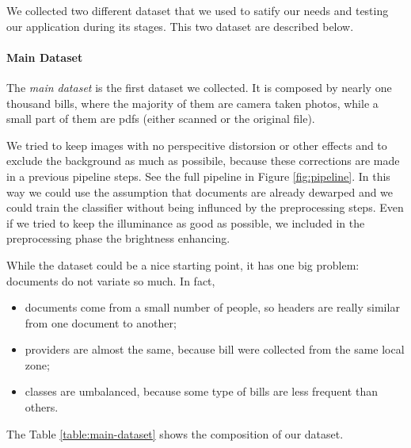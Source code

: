 \documentclass[10pt,twocolumn,letterpaper]{article}
\begin{document}
We collected two different dataset that we used to satify our needs
and testing our application during its stages. This two dataset are
described below.

\paragraph{Main Dataset}
\label{par:main-dataset}

The \emph{main dataset} is the first dataset we collected. It is
composed by nearly one thousand bills, where the majority of them are
camera taken photos, while a small part of them are pdfs (either
scanned or the original file).

We tried to keep images with no perspecitive distorsion or other
effects and to exclude the background as much as possibile, because
these corrections are made in a previous pipeline steps. See the full
pipeline in Figure \ref{fig:pipeline}.  In this way we could use the
assumption that documents are already dewarped and we could train the
classifier without being influnced by the preprocessing steps. Even if
we tried to keep the illuminance as good as possible, we included in
the preprocessing phase the brightness enhancing.

While the dataset could be a nice starting point, it has one big
problem: documents do not variate so much. In fact,
\begin{itemize}
  \item documents come from a small number of people, so headers are
    really similar from one document to another;
  \item providers are almost the same, because bill were collected
    from the same local zone;
  \item classes are umbalanced, because some type of bills are less
    frequent than others.
\end{itemize}

The Table \ref{table:main-dataset} shows the composition of our
dataset.
\end{document}
